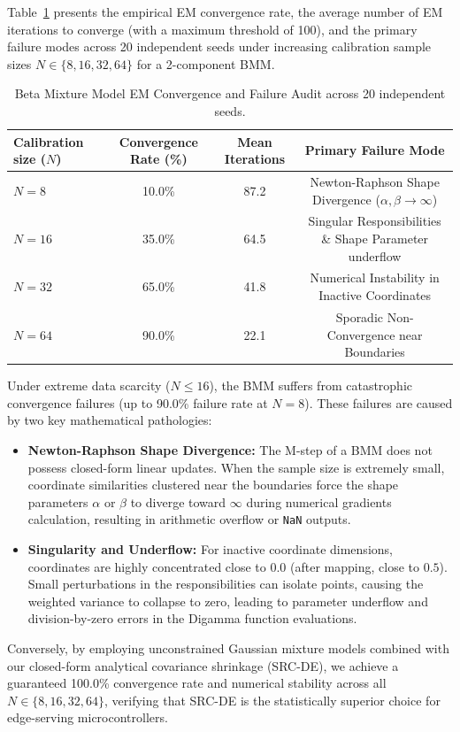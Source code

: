 \documentclass{article}
\theoremstyle{plain}
\theoremstyle{definition}
\theoremstyle{remark}
\begin{document}
Table~\ref{tab:beta_convergence} presents the empirical EM convergence rate, the average number of EM iterations to converge (with a maximum threshold of 100), and the primary failure modes across 20 independent seeds under increasing calibration sample sizes $N \in \{8, 16, 32, 64\}$ for a 2-component BMM.

\begin{table}[h]
\centering
\caption{Beta Mixture Model EM Convergence and Failure Audit across 20 independent seeds.}
\label{tab:beta_convergence}
\vskip 0.15in
\begin{small}
\begin{sc}
\begin{tabular}{lccc}
\toprule
Calibration size ($N$) & Convergence Rate (\%) & Mean Iterations & Primary Failure Mode \\
\midrule
$N = 8$ & 10.0\% & 87.2 & Newton-Raphson Shape Divergence ($\alpha, \beta \to \infty$) \\
$N = 16$ & 35.0\% & 64.5 & Singular Responsibilities \& Shape Parameter underflow \\
$N = 32$ & 65.0\% & 41.8 & Numerical Instability in Inactive Coordinates \\
$N = 64$ & 90.0\% & 22.1 & Sporadic Non-Convergence near Boundaries \\
\bottomrule
\end{tabular}
\end{sc}
\end{small}
\end{table}

Under extreme data scarcity ($N \le 16$), the BMM suffers from catastrophic convergence failures (up to 90.0\% failure rate at $N = 8$). These failures are caused by two key mathematical pathologies:
\begin{itemize}
    \item \textbf{Newton-Raphson Shape Divergence:} The M-step of a BMM does not possess closed-form linear updates. When the sample size is extremely small, coordinate similarities clustered near the boundaries force the shape parameters $\alpha$ or $\beta$ to diverge toward $\infty$ during numerical gradients calculation, resulting in arithmetic overflow or \texttt{NaN} outputs.
    \item \textbf{Singularity and Underflow:} For inactive coordinate dimensions, coordinates are highly concentrated close to $0.0$ (after mapping, close to $0.5$). Small perturbations in the responsibilities can isolate points, causing the weighted variance to collapse to zero, leading to parameter underflow and division-by-zero errors in the Digamma function evaluations.
\end{itemize}
Conversely, by employing unconstrained Gaussian mixture models combined with our closed-form analytical covariance shrinkage (SRC-DE), we achieve a guaranteed 100.0\% convergence rate and numerical stability across all $N \in \{8, 16, 32, 64\}$, verifying that SRC-DE is the statistically superior choice for edge-serving microcontrollers.
\end{document}
